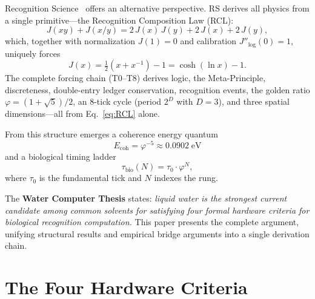 \documentclass[12pt,a4paper]{article}
\theoremstyle{definition}
\theoremstyle{remark}
\begin{document}
Recognition Science~\cite{Washburn2025} offers an alternative
perspective.  RS derives all physics from a single primitive---the
Recognition Composition Law (RCL):
\begin{equation}\label{eq:RCL}
  J(xy) + J(x/y) = 2\,J(x)\,J(y) + 2\,J(x) + 2\,J(y),
\end{equation}
which, together with normalization $J(1) = 0$ and calibration
$J''_{\log}(0) = 1$, uniquely forces~\cite{Washburn2025}
\begin{equation}\label{eq:Jcost}
  J(x) = \tfrac{1}{2}(x + x^{-1}) - 1 = \cosh(\ln x) - 1.
\end{equation}
The complete forcing chain (T0--T8) derives logic, the Meta-Principle,
discreteness, double-entry ledger conservation, recognition events,
the golden ratio $\varphi = (1+\sqrt{5})/2$, an 8-tick cycle (period
$2^D$ with $D = 3$), and three spatial dimensions---all from
Eq.~\eqref{eq:RCL} alone.

From this structure emerges a coherence energy quantum
\begin{equation}\label{eq:Ecoh}
  E_{\mathrm{coh}} = \varphi^{-5} \approx 0.0902\;\mathrm{eV}
\end{equation}
and a biological timing ladder
\begin{equation}\label{eq:philadder}
  \tau_{\mathrm{bio}}(N) = \tau_0 \cdot \varphi^N,
\end{equation}
where $\tau_0$ is the fundamental tick and $N$ indexes the rung.

The \textbf{Water Computer Thesis} states: \emph{liquid water is the
strongest current candidate among common solvents for satisfying four
formal hardware criteria for biological recognition computation.}  This
paper presents the complete argument, unifying structural results and
empirical bridge arguments into a single derivation chain.

\section{The Four Hardware Criteria}
\label{sec:criteria}
\end{document}
